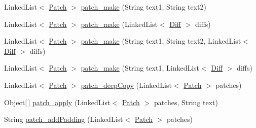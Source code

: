 \begin{DoxyCompactItemize}
\item 
Linked\+List$<$ \hyperlink{classname_1_1fraser_1_1neil_1_1plaintext_1_1diff__match__patch_1_1Patch}{Patch} $>$ \hyperlink{classname_1_1fraser_1_1neil_1_1plaintext_1_1diff__match__patch_a68c90615c738bf717863a06c9ef688cb}{patch\+\_\+make} (String text1, String text2)
\item 
Linked\+List$<$ \hyperlink{classname_1_1fraser_1_1neil_1_1plaintext_1_1diff__match__patch_1_1Patch}{Patch} $>$ \hyperlink{classname_1_1fraser_1_1neil_1_1plaintext_1_1diff__match__patch_a86d5c3426914b15f68be0ca1544cc897}{patch\+\_\+make} (Linked\+List$<$ \hyperlink{classname_1_1fraser_1_1neil_1_1plaintext_1_1diff__match__patch_1_1Diff}{Diff} $>$ diffs)
\item 
Linked\+List$<$ \hyperlink{classname_1_1fraser_1_1neil_1_1plaintext_1_1diff__match__patch_1_1Patch}{Patch} $>$ \hyperlink{classname_1_1fraser_1_1neil_1_1plaintext_1_1diff__match__patch_afd372d28eefadcc64b08432c57098805}{patch\+\_\+make} (String text1, String text2, Linked\+List$<$ \hyperlink{classname_1_1fraser_1_1neil_1_1plaintext_1_1diff__match__patch_1_1Diff}{Diff} $>$ diffs)
\item 
Linked\+List$<$ \hyperlink{classname_1_1fraser_1_1neil_1_1plaintext_1_1diff__match__patch_1_1Patch}{Patch} $>$ \hyperlink{classname_1_1fraser_1_1neil_1_1plaintext_1_1diff__match__patch_af0aa1a2aee66225d99f9dc10dc5e0edd}{patch\+\_\+make} (String text1, Linked\+List$<$ \hyperlink{classname_1_1fraser_1_1neil_1_1plaintext_1_1diff__match__patch_1_1Diff}{Diff} $>$ diffs)
\item 
Linked\+List$<$ \hyperlink{classname_1_1fraser_1_1neil_1_1plaintext_1_1diff__match__patch_1_1Patch}{Patch} $>$ \hyperlink{classname_1_1fraser_1_1neil_1_1plaintext_1_1diff__match__patch_a21cc85e40d61a8a2ebe115ef217bdc5c}{patch\+\_\+deep\+Copy} (Linked\+List$<$ \hyperlink{classname_1_1fraser_1_1neil_1_1plaintext_1_1diff__match__patch_1_1Patch}{Patch} $>$ patches)
\item 
Object\mbox{[}$\,$\mbox{]} \hyperlink{classname_1_1fraser_1_1neil_1_1plaintext_1_1diff__match__patch_a874b83ad5159cf5a7be96aba8da98806}{patch\+\_\+apply} (Linked\+List$<$ \hyperlink{classname_1_1fraser_1_1neil_1_1plaintext_1_1diff__match__patch_1_1Patch}{Patch} $>$ patches, String text)
\item 
String \hyperlink{classname_1_1fraser_1_1neil_1_1plaintext_1_1diff__match__patch_a058d109ed2947aefd7c0a86bedcf16b5}{patch\+\_\+add\+Padding} (Linked\+List$<$ \hyperlink{classname_1_1fraser_1_1neil_1_1plaintext_1_1diff__match__patch_1_1Patch}{Patch} $>$ patches)

\end{DoxyCompactItemize}
